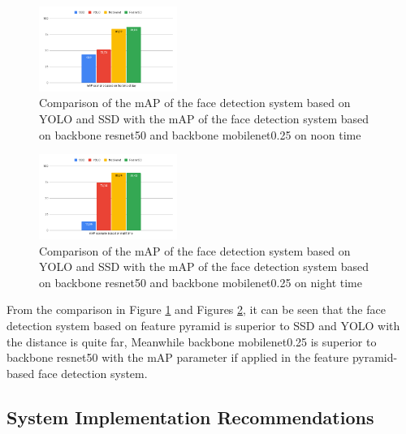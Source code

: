 \begin{figure} [ht]
  \centering
  \includegraphics[width=0.4\textwidth]{gambar/perbandinganmapsiang.png}

  \caption{Comparison of the mAP of the face detection system based on YOLO and SSD with the mAP of the face detection system based on backbone resnet50 and backbone mobilenet0.25 on noon time}
  \label{fig:perbandinganmapsiang}
\end{figure}

\begin{figure} [ht]
  \centering
  \includegraphics[width=0.4\textwidth]{gambar/perbandinganmapmalam.png}

  \caption{Comparison of the mAP of the face detection system based on YOLO and SSD with the mAP of the face detection system based on backbone resnet50 and backbone mobilenet0.25 on night time}
  \label{fig:perbandinganmapmalam}
\end{figure}

From the comparison in Figure \ref{fig:perbandinganmapsiang} and Figures \ref{fig:perbandinganmapmalam}, it can be seen that the face detection system based on feature pyramid 
is superior to SSD and YOLO with 
the distance is quite far, Meanwhile backbone mobilenet0.25 is superior to backbone resnet50 with the mAP parameter if applied
in the feature pyramid-based face detection system.

\subsection{System Implementation Recommendations}

